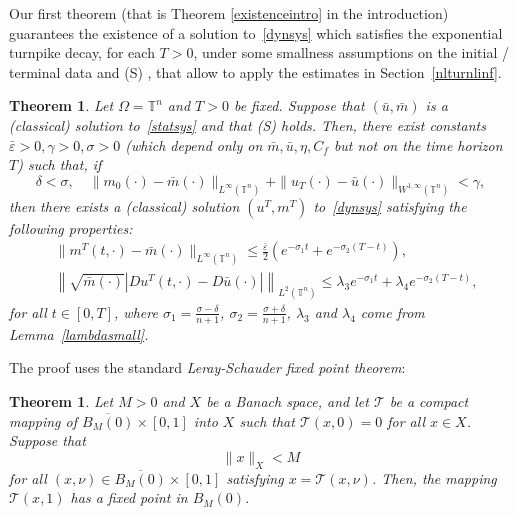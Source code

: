 \documentclass[10pt,a4paper,nouppercase,nowrite]{article}
\numberwithin{equation}{section}
\newcommand{\Sp}{{\textsc (S)} }
\newcommand{\eps}{\varepsilon}
\newcommand{\T}{\mathbb{T}}
\newtheorem{thm}[defn]{Theorem}
\theoremstyle{definition}
\begin{document}
Our first theorem (that is Theorem \ref{existenceintro} in the introduction) guarantees the existence of a solution to~\eqref{dynsys} which satisfies the exponential turnpike decay, for each $T > 0$, under some smallness assumptions on the initial / terminal data and \Sp, that allow to apply the estimates in Section~\ref{nlturnlinf}. 
		\begin{thm} \label{existence}
		Let $\Omega=\T^n$ and $T>0$ be fixed. Suppose that $(\bar u, \bar m)$ is a (classical) solution to~\eqref{statsys} and that \Sp holds. Then, there exist constants $\bar \eps > 0, \gamma > 0, \sigma > 0$ (which depend only on $\bar m, \bar u, \eta, C_f$ but not on the time horizon $T$) such that, if
		\begin{equation*}
					\delta < \sigma, \quad \| m_0(\cdot)-\bar m(\cdot) \|_{L^{\infty}(\T^n)} + \|u_T(\cdot) - \bar u(\cdot)\|_{W^{1,\infty}(\T^n)} < \gamma,
		\end{equation*}
		then there exists a (classical) solution $(u^T,m^T)$ to~\eqref{dynsys} satisfying the following properties:
				\begin{align} \label{turnpike}
				&\|m^T(t,\cdot)-\bar m(\cdot)\|_{L^{\infty}(\T^n)} \le \frac{\bar{\eps}}{2} \left( e^{-\sigma_1 t} + e^{-\sigma_2(T-t)} \right), \\
				&\left \| \sqrt{\bar m(\cdot)} \left| Du^T(t,\cdot) - D\bar u(\cdot) \right| \right \|_{L^2(\T^n)} \le \lambda_3 e^{-\sigma_1 t} + \lambda_4 e^{-\sigma_2(T-t)}, \label{turnpikeDuT}
			\end{align}
			for all $t \in [0,T]$, where $\sigma_1=\frac{\sigma-\delta}{n+1}$, $\sigma_2=\frac{\sigma+\delta}{n+1}$, $\lambda_3$ and $\lambda_4$ come from Lemma~\ref{lambdasmall}.
		\end{thm}
		
		The proof uses the standard \textit{Leray-Schauder fixed point theorem}:
		\begin{thm}
			Let $M>0$ and $X$ be a Banach space, and let $\mathcal{T}$ be a compact mapping of $\overline{B_M(0)} \times [0,1]$ into $X$ such that $\mathcal{T}(x,0)=0$ for all $x \in X$. Suppose that 
			\begin{equation*}\label{xM}
			\| x \|_X < M
			\end{equation*}
			for all $(x,\nu) \in \overline{B_M(0)} \times [0,1]$ satisfying $x = \mathcal{T}(x,\nu)$. Then, the mapping $\mathcal{T}(x,1)$ has a fixed point in $B_M(0)$.
			\label{fixedGT}
		\end{thm}
		
\end{document}
